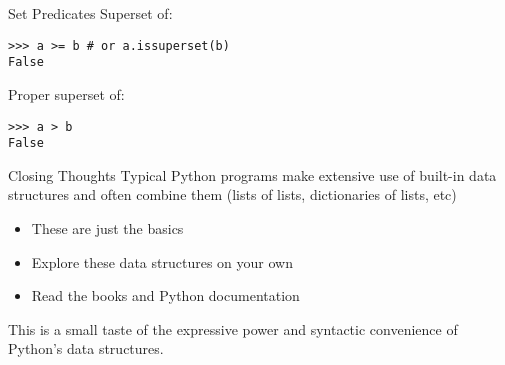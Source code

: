\documentclass[smaller]{beamer}
\begin{document}
\begin{frame}[label={sec:orgb952bec},fragile]{Set Predicates}
 Superset of:

\lstset{language=Python,label= ,caption= ,captionpos=b,numbers=none}
\begin{lstlisting}
>>> a >= b # or a.issuperset(b)
False
\end{lstlisting}

Proper superset of:

\lstset{language=Python,label= ,caption= ,captionpos=b,numbers=none}
\begin{lstlisting}
>>> a > b
False
\end{lstlisting}
\end{frame}

\begin{frame}[label={sec:orgf46b706}]{Closing Thoughts}
Typical Python programs make extensive use of built-in data structures and often combine them (lists of lists, dictionaries of lists, etc)

\begin{itemize}
\item These are just the basics
\item Explore these data structures on your own
\item Read the books and Python documentation
\end{itemize}


This is a small taste of the expressive power and syntactic
convenience of Python's data structures.
\end{frame}
\end{document}
